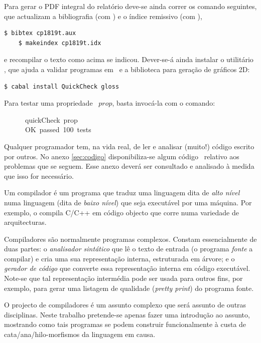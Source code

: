 \documentclass[a4paper]{article}
\let\uk=\emph
\newcommand{\Varid}[1]{\mathit{#1}}
\begin{document}
Para gerar o PDF integral do relatório deve-se ainda correr os comando seguintes,
que actualizam a bibliografia (com \Bibtex) e o índice remissivo (com \Makeindex),
\begin{Verbatim}[fontsize=\small]
    $ bibtex cp1819t.aux
    $ makeindex cp1819t.idx
\end{Verbatim}
e recompilar o texto como acima se indicou. Dever-se-á ainda instalar o utilitário
\QuickCheck,
que ajuda a validar programas em \Haskell\ e a biblioteca  para
geração de gráficos 2D:
\begin{Verbatim}[fontsize=\small]
    $ cabal install QuickCheck gloss
\end{Verbatim}
Para testar uma propriedade \QuickCheck~\ensuremath{\Varid{prop}}, basta invocá-la com o comando:
\begin{tabbing}\ttfamily
~~~~~~quickCheck~prop\\
\ttfamily ~~~~~~OK~passed~100~tests
\end{tabbing}

Qualquer programador tem, na vida real, de ler e analisar (muito!) código
escrito por outros. No anexo \ref{sec:codigo} disponibiliza-se algum
código \Haskell\ relativo aos problemas que se seguem. Esse anexo deverá
ser consultado e analisado à medida que isso for necessário.

\Problema

Um compilador é um programa que traduz uma linguagem dita de
\emph{alto nível} numa linguagem (dita de \emph{baixo nível}) que
seja executável por uma máquina.
Por exemplo, o  compila C/C++ em código objecto que
corre numa variedade de arquitecturas.

Compiladores são normalmente programas complexos.
Constam essencialmente de duas partes:
o \emph{analisador sintático} que lê o texto de entrada
(o programa \emph{fonte} a compilar) e cria uma sua representação
interna, estruturada em árvore;
e o \emph{gerador de código} que converte essa representação interna
em código executável.
Note-se que tal representação intermédia pode ser usada para outros fins,
por exemplo,
para gerar uma listagem de qualidade (\uk{pretty print}) do programa fonte.

O projecto de compiladores é um assunto complexo que
será assunto de outras disciplinas.
Neste trabalho pretende-se apenas fazer uma introdução ao assunto,
mostrando como tais programas se podem construir funcionalmente à custa de
cata/ana/hilo-morfismos da linguagem em causa.
\end{document}
